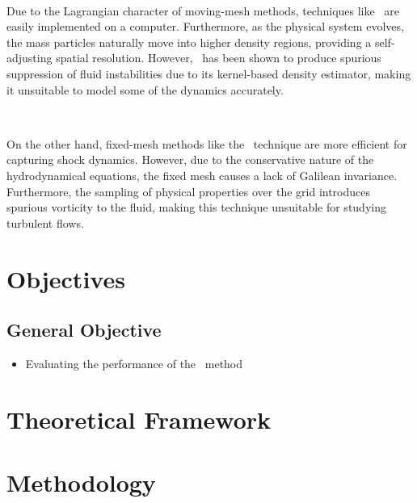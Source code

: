 \documentclass[a4,useAMS,usenatbib,usegraphicx,12pt]{article}
\begin{document}
\

Due to the Lagrangian character of moving-mesh methods, techniques like \SPH\ 
are easily implemented on a computer. Furthermore, as the physical system 
evolves, the mass particles naturally move into higher density regions, 
providing a self-adjusting spatial resolution. However, \SPH\ has been shown 
to produce spurious suppression of fluid instabilities due to its kernel-based
density estimator, making it unsuitable to model some of the dynamics 
accurately. 

\

On the other hand, fixed-mesh methods like the \AMR\ technique are more 
efficient for capturing shock dynamics. However, due to the conservative nature 
of the hydrodynamical equations, the fixed mesh causes a lack of Galilean 
invariance. Furthermore, the sampling of physical properties over the grid 
introduces spurious vorticity to the fluid, making this technique unsuitable 
for studying turbulent flows.



\section{Objectives}
\subsection*{General Objective}
\begin{itemize}
	\item Evaluating the performance of the \VPH\ method
\end{itemize}


\section{Theoretical Framework}


\section{Methodology}
\end{document}
